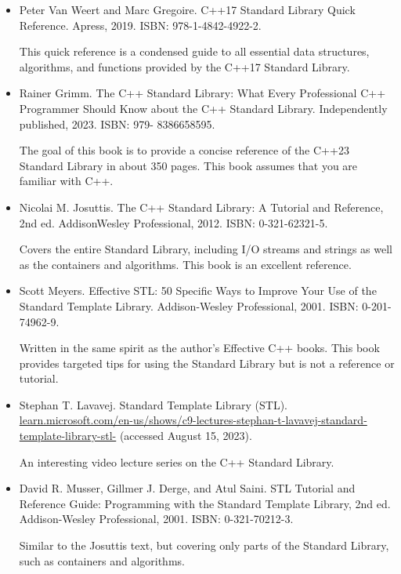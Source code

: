 \begin{itemize}
\item
Peter Van Weert and Marc Gregoire. C++17 Standard Library Quick Reference. Apress, 2019. ISBN: 978-1-4842-4922-2.

This quick reference is a condensed guide to all essential data structures, algorithms, and functions provided by the C++17 Standard Library.

\item
Rainer Grimm. The C++ Standard Library: What Every Professional C++ Programmer Should Know about the C++ Standard Library. Independently published, 2023. ISBN: 979- 8386658595.

The goal of this book is to provide a concise reference of the C++23 Standard Library in about 350 pages. This book assumes that you are familiar with C++.

\item
Nicolai M. Josuttis. The C++ Standard Library: A Tutorial and Reference, 2nd ed. AddisonWesley Professional, 2012. ISBN: 0-321-62321-5.

Covers the entire Standard Library, including I/O streams and strings as well as the containers and algorithms. This book is an excellent reference.

\item
Scott Meyers. Effective STL: 50 Specific Ways to Improve Your Use of the Standard Template Library. Addison-Wesley Professional, 2001. ISBN: 0-201-74962-9.

Written in the same spirit as the author’s Effective C++ books. This book provides targeted tips for using the Standard Library but is not a reference or tutorial.

\item
Stephan T. Lavavej. Standard Template Library (STL). \url{learn.microsoft.com/en-us/shows/c9-lectures-stephan-t-lavavej-standard-template-library-stl-} (accessed August 15, 2023).

An interesting video lecture series on the C++ Standard Library.

\item
David R. Musser, Gillmer J. Derge, and Atul Saini. STL Tutorial and Reference Guide: Programming with the Standard Template Library, 2nd ed. Addison-Wesley Professional, 2001. ISBN: 0-321-70212-3.

Similar to the Josuttis text, but covering only parts of the Standard Library, such as containers and algorithms.
\end{itemize}

